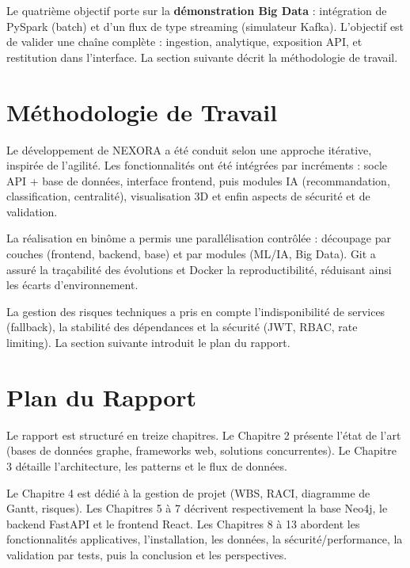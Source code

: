 \documentclass[12pt,a4paper]{report}
\begin{document}
Le quatrième objectif porte sur la \textbf{démonstration Big Data} : intégration de PySpark (batch) et d'un flux de type streaming (simulateur Kafka). L'objectif est de valider une chaîne complète : ingestion, analytique, exposition API, et restitution dans l'interface. La section suivante décrit la méthodologie de travail.

\section{Méthodologie de Travail}
Le développement de NEXORA a été conduit selon une approche itérative, inspirée de l'agilité. Les fonctionnalités ont été intégrées par incréments : socle API + base de données, interface frontend, puis modules IA (recommandation, classification, centralité), visualisation 3D et enfin aspects de sécurité et de validation.

La réalisation en binôme a permis une parallélisation contrôlée : découpage par couches (frontend, backend, base) et par modules (ML/IA, Big Data). Git a assuré la traçabilité des évolutions et Docker la reproductibilité, réduisant ainsi les écarts d'environnement.

La gestion des risques techniques a pris en compte l'indisponibilité de services (fallback), la stabilité des dépendances et la sécurité (JWT, RBAC, rate limiting). La section suivante introduit le plan du rapport.

\section{Plan du Rapport}
Le rapport est structuré en treize chapitres. Le Chapitre 2 présente l'état de l'art (bases de données graphe, frameworks web, solutions concurrentes). Le Chapitre 3 détaille l'architecture, les patterns et le flux de données.

Le Chapitre 4 est dédié à la gestion de projet (WBS, RACI, diagramme de Gantt, risques). Les Chapitres 5 à 7 décrivent respectivement la base Neo4j, le backend FastAPI et le frontend React. Les Chapitres 8 à 13 abordent les fonctionnalités applicatives, l'installation, les données, la sécurité/performance, la validation par tests, puis la conclusion et les perspectives.
\end{document}
